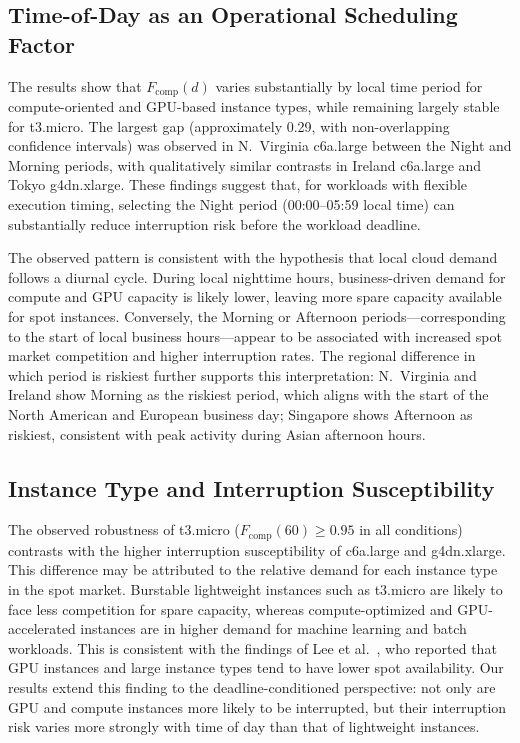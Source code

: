 \documentclass[runningheads]{llncs}
\begin{document}
\subsection{Time-of-Day as an Operational Scheduling Factor}

The results show that $F_{\mathrm{comp}}(d)$ varies substantially by local time period for compute-oriented and GPU-based instance types, while remaining largely stable for t3.micro. The largest gap (approximately 0.29, with non-overlapping confidence intervals) was observed in N.~Virginia c6a.large between the Night and Morning periods, with qualitatively similar contrasts in Ireland c6a.large and Tokyo g4dn.xlarge. These findings suggest that, for workloads with flexible execution timing, selecting the Night period (00:00–05:59 local time) can substantially reduce interruption risk before the workload deadline.

The observed pattern is consistent with the hypothesis that local cloud demand follows a diurnal cycle. During local nighttime hours, business-driven demand for compute and GPU capacity is likely lower, leaving more spare capacity available for spot instances. Conversely, the Morning or Afternoon periods—corresponding to the start of local business hours—appear to be associated with increased spot market competition and higher interruption rates. The regional difference in which period is riskiest further supports this interpretation: N.~Virginia and Ireland show Morning as the riskiest period, which aligns with the start of the North American and European business day; Singapore shows Afternoon as riskiest, consistent with peak activity during Asian afternoon hours.

\subsection{Instance Type and Interruption Susceptibility}

The observed robustness of t3.micro ($F_{\mathrm{comp}}(60) \geq 0.95$ in all conditions) contrasts with the higher interruption susceptibility of c6a.large and g4dn.xlarge. This difference may be attributed to the relative demand for each instance type in the spot market. Burstable lightweight instances such as t3.micro are likely to face less competition for spare capacity, whereas compute-optimized and GPU-accelerated instances are in higher demand for machine learning and batch workloads. This is consistent with the findings of Lee et al.~\cite{Lee2022SpotLake}, who reported that GPU instances and large instance types tend to have lower spot availability. Our results extend this finding to the deadline-conditioned perspective: not only are GPU and compute instances more likely to be interrupted, but their interruption risk varies more strongly with time of day than that of lightweight instances.
\end{document}
